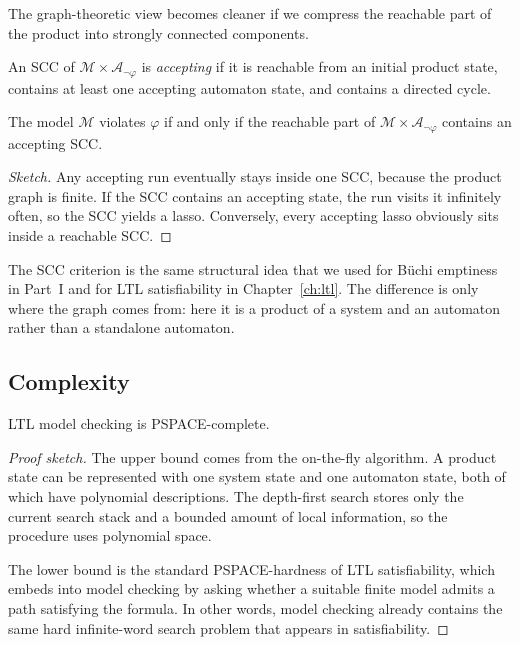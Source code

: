 The graph-theoretic view becomes cleaner if we compress the reachable part of
the product into strongly connected components.

\begin{definition}
An SCC of $\mathcal{M}\times\mathcal{A}_{\neg\varphi}$ is \emph{accepting} if
it is reachable from an initial product state, contains at least one
accepting automaton state, and contains a directed cycle.
\end{definition}

\begin{proposition}
The model $\mathcal{M}$ violates $\varphi$ if and only if the reachable part
of $\mathcal{M}\times\mathcal{A}_{\neg\varphi}$ contains an accepting SCC.
\end{proposition}

\begin{proof}[Sketch]
Any accepting run eventually stays inside one SCC, because the product graph
is finite.  If the SCC contains an accepting state, the run visits it
infinitely often, so the SCC yields a lasso.  Conversely, every accepting
lasso obviously sits inside a reachable SCC.
\end{proof}

\medskip\noindent
The SCC criterion is the same structural idea that we used for Büchi
emptiness in Part~I and for LTL satisfiability in Chapter~\ref{ch:ltl}.  The
difference is only where the graph comes from: here it is a product of a
system and an automaton rather than a standalone automaton.

\subsection{Complexity}

\begin{proposition}
\label{prop:ltl-mc-pspace}
LTL model checking is PSPACE-complete.
\end{proposition}

\begin{proof}[Proof sketch]
The upper bound comes from the on-the-fly algorithm.  A product state can be
represented with one system state and one automaton state, both of which have
polynomial descriptions.  The depth-first search stores only the current
search stack and a bounded amount of local information, so the procedure uses
polynomial space.

The lower bound is the standard PSPACE-hardness of LTL satisfiability, which
embeds into model checking by asking whether a suitable finite model admits a
path satisfying the formula.  In other words, model checking already contains
the same hard infinite-word search problem that appears in satisfiability.
\end{proof}

